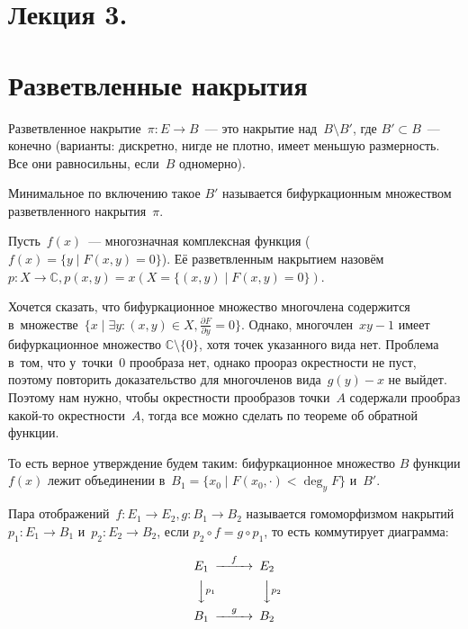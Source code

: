 \documentclass{article}
\begin{document}
\section*{Лекция 3. }

\resetcntrs

\section{Разветвленные накрытия}

\begin{definition}
	Разветвленное накрытие~$\pi: E \rightarrow B$~--- это накрытие над~$B
	\setminus B'$, где $B' \subset B$~--- конечно (варианты: дискретно, нигде не
	плотно, имеет меньшую размерность. Все они равносильны, если~$B$ одномерно).

	Минимальное по включению такое $B'$ называется бифуркационным множеством
	разветвленного накрытия~$\pi$.
\end{definition}

\begin{definition}
	Пусть~$f(x)$~--- многозначная комплексная функция ($f(x) = \{y \mid F(x, y) =
	0\}$). Её разветвленным накрытием назовём $p: X \rightarrow \mathbb{C}, p(x,
	y) = x (X = \{(x, y) \mid F(x, y) = 0\})$.
\end{definition}

Хочется сказать, что бифуркационное множество многочлена содержится
в~множестве~$\{x \mid \exists y: (x, y) \in X, \frac{\partial F}{\partial y} =
0\}$. Однако, многочлен~$xy - 1$ имеет бифуркационное множество $\mathbb{C}
\setminus \{0\}$, хотя точек указанного вида нет. Проблема в~том, что у~точки~0
прообраза нет, однако проораз окрестности не пуст, поэтому повторить
доказательство для многочленов вида~$g(y) - x$ не выйдет. Поэтому нам нужно,
чтобы окрестности прообразов точки~$A$ содержали прообраз какой-то
окрестности~$A$, тогда все можно сделать по теореме об обратной функции.

То есть верное утверждение будем таким: бифуркационное множество $B$ функции
$f(x)$ лежит объединении в~$B_1 = \{x_0 \mid F(x_0, \cdot) < \deg_y F\}$ и~$B'$.

\begin{definition}
	Пара отображений~$f: E_1 \rightarrow E_2, g: B_1 \rightarrow B_2$ называется
	гомоморфизмом накрытий~$p_1: E_1 \rightarrow B_1$ и~$p_2: E_2 \rightarrow
	B_2$, если $p_2 \circ f = g \circ p_1$, то есть коммутирует диаграмма:

	$$\begin{CD}
	   E_1     @>f>>       E_2\\
	 @VV p_1 V          @VV p_2 V\\
		 B_1     @>g>>       B_2
	\end{CD}$$
\end{definition}
\end{document}
